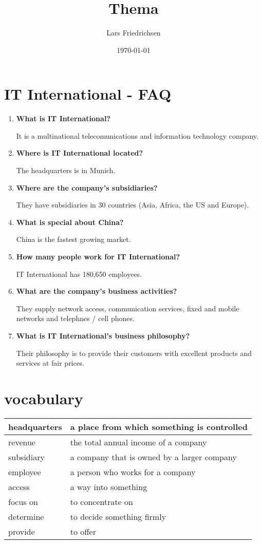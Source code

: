 \documentclass[a4paper,11pt]{scrartcl}	%
\title{Thema}
\author{Lars Friedrichsen}
\date{\today}
\begin{document}
\section{IT International - FAQ}

	\begin{enumerate}
		\item \textbf{What is IT International?}\par
		It is a multinational telecomunications and information technology company.		
		\item \textbf{Where is IT International located?}\par
		The headquarters is in Munich.
		\item \textbf{Where are the company's subsidiaries?}\par
		They have subsidiaries in 30 countries (Asia, Africa, the US and Europe).
		\item \textbf{What is special about China?}\par
		China is the fastest growing market.
		\item \textbf{How many people work for IT International?}\par
		IT International has 180,650 employees.
		\item \textbf{What are the company's business activities?}\par
		They supply network access, communication services, fixed and mobile networks and telephnes / cell phones.
		\item \textbf{What is IT International's business philosophy?}\par
		Their philosophy is to provide their customers with excellent products and services at fair prices.
	\end{enumerate}

\section{vocabulary}

\begin{tabular}{|l|l|}
	\hline
	headquarters		&		a place from which something is controlled \\ \hline
	revenue				&		the total annual income of a company\\ \hline
	subsidiary			&		a company that is owned by a larger company\\ \hline
	employee			&		a person who works for a company\\ \hline
	access				&		a way into something\\ \hline
	focus on			&		to concentrate on\\ \hline
	determine			&		to decide something firmly\\ \hline
	provide				&		to offer\\ \hline
\end{tabular}
\end{document}
